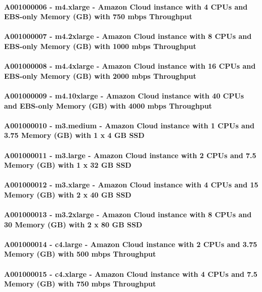 \documentclass{acm_proc_article-sp}
\begin{document}
\paragraph{A001000006 - m4.xlarge - Amazon Cloud instance with 4 CPUs and EBS-only Memory (GB) with 750 mbps Throughput}
\paragraph{A001000007 - m4.2xlarge - Amazon Cloud instance with 8 CPUs and EBS-only Memory (GB) with 1000 mbps Throughput}
\paragraph{A001000008 - m4.4xlarge - Amazon Cloud instance with 16 CPUs and EBS-only Memory (GB) with 2000 mbps Throughput}
\paragraph{A001000009 - m4.10xlarge - Amazon Cloud instance with 40 CPUs and EBS-only Memory (GB) with 4000 mbps Throughput}
\paragraph{A001000010 - m3.medium - Amazon Cloud instance with 1 CPUs and 3.75 Memory (GB) with 1 x 4 GB SSD}
\paragraph{A001000011 - m3.large - Amazon Cloud instance with 2 CPUs and 7.5 Memory (GB) with 1 x 32 GB SSD}
\paragraph{A001000012 - m3.xlarge - Amazon Cloud instance with 4 CPUs and 15 Memory (GB) with 2 x 40 GB SSD}
\paragraph{A001000013 - m3.2xlarge - Amazon Cloud instance with 8 CPUs and 30 Memory (GB) with 2 x 80 GB SSD}
\paragraph{A001000014 - c4.large - Amazon Cloud instance with 2 CPUs and 3.75 Memory (GB) with 500 mbps Throughput}
\paragraph{A001000015 - c4.xlarge - Amazon Cloud instance with 4 CPUs and 7.5 Memory (GB) with 750 mbps Throughput}
\end{document}
